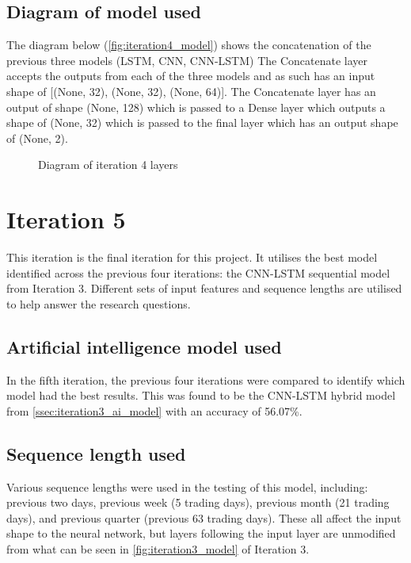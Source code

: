 \subsection{Diagram of model used}
The diagram below (\autoref{fig:iteration4_model}) shows the concatenation of the previous three models (LSTM, CNN, CNN-LSTM)
The Concatenate layer accepts the outputs from each of the three models and as such has an input shape of
{[(None, 32), (None, 32), (None, 64)]}. The Concatenate layer has an output of shape (None, 128) which is passed to a Dense
layer which outputs a shape of (None, 32) which is passed to the final layer which has an output shape of (None, 2).
\begin{figure}[p]
    \centering
    \caption[Diagram of iteration 4 layers]{Diagram of iteration 4 layers}
    \label{fig:iteration4_model}
\end{figure}
\FloatBarrier

\section{Iteration 5}
This iteration is the final iteration for this project. It utilises the best model identified across the
previous four iterations: the CNN-LSTM sequential model from Iteration 3. Different sets of input features
and sequence lengths are utilised to help answer the research questions.

\subsection{Artificial intelligence model used}\label{ssec:iteration5_ai_model}
In the fifth iteration, the previous four iterations were compared to identify which model had the best results.
This was found to be the CNN-LSTM hybrid model from \autoref{ssec:iteration3_ai_model} with an accuracy of 56.07\%.

\subsection{Sequence length used}
Various sequence lengths were used in the testing of this model, including: previous two days,
previous week (5 trading days), previous month (21 trading days), and previous quarter (previous 63 trading days).
These all affect the input shape to the neural network, but layers following the input layer are unmodified from
what can be seen in \autoref{fig:iteration3_model} of Iteration 3.

